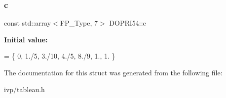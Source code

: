 \subsubsection{\texorpdfstring{c}{c}}
{\footnotesize\ttfamily const std\+::array$<$F\+P\+\_\+\+Type, 7$>$ D\+O\+P\+R\+I54\+::c}

{\bfseries Initial value\+:}
\begin{DoxyCode}
= \{
    0, 1./5, 3./10, 4./5, 8./9, 1., 1.
  \}
\end{DoxyCode}


The documentation for this struct was generated from the following file\+:\begin{DoxyCompactItemize}
\item 
ivp/tableau.\+h\end{DoxyCompactItemize}
